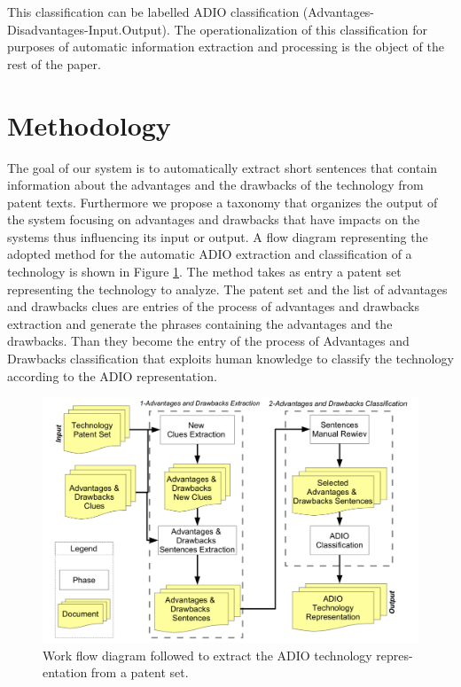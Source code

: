 \documentclass[]{book}
\begin{document}
This classification can be labelled ADIO classification
(Advantages-Disadvantages-Input.Output). The operationalization of this
classification for purposes of automatic information extraction and
processing is the object of the rest of the paper.

\section{Methodology}\label{methodology-9}

The goal of our system is to automatically extract short sentences that
contain information about the advantages and the drawbacks of the
technology from patent texts. Furthermore we propose a taxonomy that
organizes the output of the system focusing on advantages and drawbacks
that have impacts on the systems thus influencing its input or output. A
flow diagram representing the adopted method for the automatic ADIO
extraction and classification of a technology is shown in Figure
\ref{fig:adioworkflow}. The method takes as entry a patent set
representing the technology to analyze. The patent set and the list of
advantages and drawbacks clues are entries of the process of advantages
and drawbacks extraction and generate the phrases containing the
advantages and the drawbacks. Than they become the entry of the process
of Advantages and Drawbacks classification that exploits human knowledge
to classify the technology according to the ADIO representation.

\begin{figure}

{\centering \includegraphics[width=0.8\linewidth]{_bookdown_files/figures/adioworkflow} 

}

\caption{Work flow diagram followed to extract the ADIO technology repres- entation from a patent set.}\label{fig:adioworkflow}
\end{figure}
\end{document}
